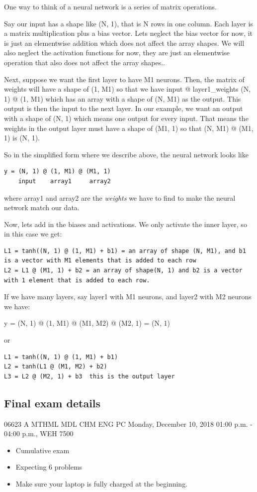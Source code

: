 \documentclass[11pt]{article}
\begin{document}
One way to think of a neural network is a series of matrix operations.


Say our input has a shape like (N, 1), that is N rows in one column. Each layer is a matrix multiplication plus a bias vector. Lets neglect the bias vector for now, it is just an elementwise addition which does not affect the array shapes. We will also neglect the activation functions for now, they are just an elementwise operation that also does not affect the array shapes..

Next, suppose we want the first layer to have M1 neurons. Then, the matrix of weights will have a shape of (1, M1) so that we have input @ layer1\_weights (N, 1) @ (1, M1) which has an array with a shape of (N, M1) as the output. This output is then the input to the next layer. In our example, we want an output with a shape of (N, 1) which means one output for every input. That means the weights in the output layer must have a shape of (M1, 1) so that (N, M1) @ (M1, 1) is (N, 1).

So in the simplified form where we describe above, the neural network looks like

\begin{verbatim}
y = (N, 1) @ (1, M1) @ (M1, 1)
    input    array1     array2
\end{verbatim}

where array1 and array2 are the \emph{weights} we have to find to make the neural network match our data.

Now, lets add in the biases and activations. We only activate the inner layer, so in this case we get:

\begin{verbatim}
L1 = tanh((N, 1) @ (1, M1) + b1) = an array of shape (N, M1), and b1 is a vector with M1 elements that is added to each row
L2 = L1 @ (M1, 1) + b2 = an array of shape(N, 1) and b2 is a vector with 1 element that is added to each row.
\end{verbatim}

If we have many layers, say layer1 with M1 neurons, and layer2 with M2 neurons we have:

y = (N, 1) @ (1, M1) @ (M1, M2) @ (M2, 1) = (N, 1)

or

\begin{verbatim}
L1 = tanh((N, 1) @ (1, M1) + b1)
L2 = tanh(L1 @ (M1, M2) + b2)
L3 = L2 @ (M2, 1) + b3  this is the output layer
\end{verbatim}



\subsection{Final exam details}
\label{sec:org0dcd5f7}

06623 A MTHML MDL CHM ENG PC Monday, December 10, 2018 01:00 p.m. - 04:00 p.m., WEH 7500

\begin{itemize}
\item Cumulative exam
\item Expecting 6 problems
\item Make sure your laptop is fully charged at the beginning.
\end{itemize}
\end{document}
